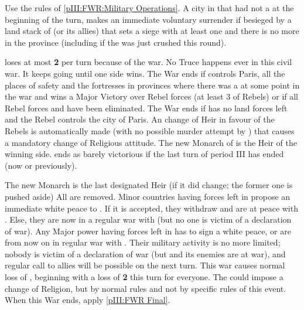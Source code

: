 \begin{digressions}



  \phmil
  \aparag Use the rules of \ref{pIII:FWR:Military Operations}.
  \aparag A city in \FRA that had not a \REVOLT \faceplus at the beginning of
  the turn, makes an immediate voluntary surrender if besieged by a land stack
  of \FRA (or its allies) that sets a siege with at least one \ARMY \faceplus
  and there is no more \REVOLT in the province (including if the \REVOLT was
  just crushed this round).



  \phpaix
  \aparag \FRA loses at most {\bf 2} \STAB per turn because of the war.
  \aparag No Truce happens ever in this civil war. It keeps going until one
  side wins.
  \aparag The War ends if \FRA controls Paris, all the places of safety and
  the fortresses in provinces where there was a \REVOLT\faceplus at some point
  in the war and wins a Major Victory over
  Rebel forces (at least 3 \DT of Rebels) or if all Rebel forces and \REVOLT
  have been eliminated.
  \aparag The War ends if \FRA has no land forces left and the Rebel controls
  the city of Paris. An change of Heir in favour of the Rebels is
  automatically made (with no possible murder attempt by \FRA) that causes a
  mandatory change of Religious attitude. The new Monarch of \FRA is the Heir
  of the winning side.
  \aparag \FRA ends as barely victorious if the last turn of period III has
  ended (now or previously).



  \phpaix
  \bparag The new Monarch is the last designated Heir (if it did change; the
  former one is pushed aside)
  \bparag All \REVOLT %
  are removed.
  \bparag Minor countries having forces left in \FRA propose an immediate
  white peace to \FRA. If it is accepted, they withdraw and are at peace with
  \FRA. Else, they are now in a regular war with \FRA (but no one is victim of
  a declaration of war).
  \bparag Any Major power having forces left in \FRA has to sign a white
  peace, or are from now on in regular war with \FRA.  Their military activity
  is no more limited; nobody is victim of a declaration of war (but \FRA and
  its enemies are at war), and regular call to allies will be possible on the
  next turn.  This war causes normal loss of \STAB, beginning with a loss of
  {\bf 2} \STAB this turn for everyone. The \SDCF could impose a change of
  Religion, but by normal rules and not by specific rules of this event.
  \bparag When this War ends, apply \ref{pIII:FWR Final}.
\end{digressions}




